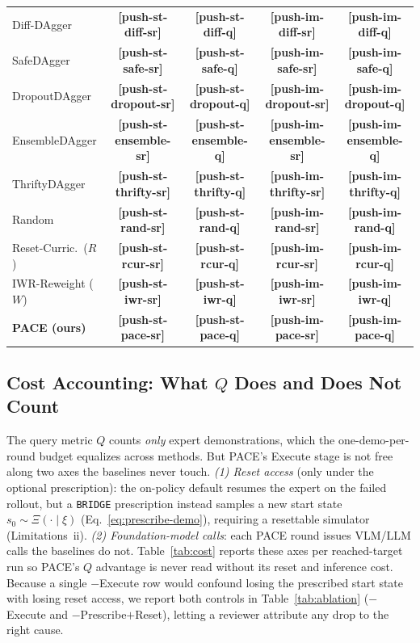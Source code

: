 \documentclass[letterpaper]{article} %
\newcommand{\PH}[1]{{\color{red}\textbf{[#1]}}}
\begin{document}
\begin{table}[t]
\begin{tabular}{l cc cc}
Diff-DAgger    & \PH{push-st-diff-sr}     & \PH{push-st-diff-q}     & \PH{push-im-diff-sr}     & \PH{push-im-diff-q} \\
SafeDAgger     & \PH{push-st-safe-sr}     & \PH{push-st-safe-q}     & \PH{push-im-safe-sr}     & \PH{push-im-safe-q} \\
DropoutDAgger  & \PH{push-st-dropout-sr}  & \PH{push-st-dropout-q}  & \PH{push-im-dropout-sr}  & \PH{push-im-dropout-q} \\
EnsembleDAgger & \PH{push-st-ensemble-sr} & \PH{push-st-ensemble-q} & \PH{push-im-ensemble-sr} & \PH{push-im-ensemble-q} \\
ThriftyDAgger  & \PH{push-st-thrifty-sr}  & \PH{push-st-thrifty-q}  & \PH{push-im-thrifty-sr}  & \PH{push-im-thrifty-q} \\
Random         & \PH{push-st-rand-sr}     & \PH{push-st-rand-q}     & \PH{push-im-rand-sr}     & \PH{push-im-rand-q} \\
Reset-Curric.\ ($R$) & \PH{push-st-rcur-sr} & \PH{push-st-rcur-q} & \PH{push-im-rcur-sr} & \PH{push-im-rcur-q} \\
IWR-Reweight ($W$)   & \PH{push-st-iwr-sr}  & \PH{push-st-iwr-q}  & \PH{push-im-iwr-sr}  & \PH{push-im-iwr-q} \\
\textbf{PACE (ours)} & \PH{push-st-pace-sr} & \PH{push-st-pace-q} & \PH{push-im-pace-sr} & \PH{push-im-pace-q} \\
\bottomrule
\end{tabular}
\end{table}

\subsection{Cost Accounting: What $Q$ Does and Does Not Count}

The query metric $Q$ counts \emph{only} expert demonstrations, which the
one-demo-per-round budget equalizes across methods. But PACE's Execute stage is not
free along two axes the baselines never touch. \emph{(1) Reset access} (only under the
optional prescription): the on-policy default resumes the expert on the failed
rollout, but a \texttt{BRIDGE} prescription instead samples a new start state
$s_0\sim\Xi(\cdot\mid\xi)$ (Eq.~\ref{eq:prescribe-demo}), requiring a resettable
simulator (Limitations~ii). \emph{(2) Foundation-model calls}: each PACE round issues
VLM/LLM calls the baselines do not. Table~\ref{tab:cost} reports these axes per
reached-target run so PACE's $Q$ advantage is never read without its reset and
inference cost. Because a single $-$Execute row would confound losing the prescribed
start state with losing reset access, we report both controls in
Table~\ref{tab:ablation} ($-$Execute and $-$Prescribe$+$Reset), letting a reviewer
attribute any drop to the right cause.
\end{document}
